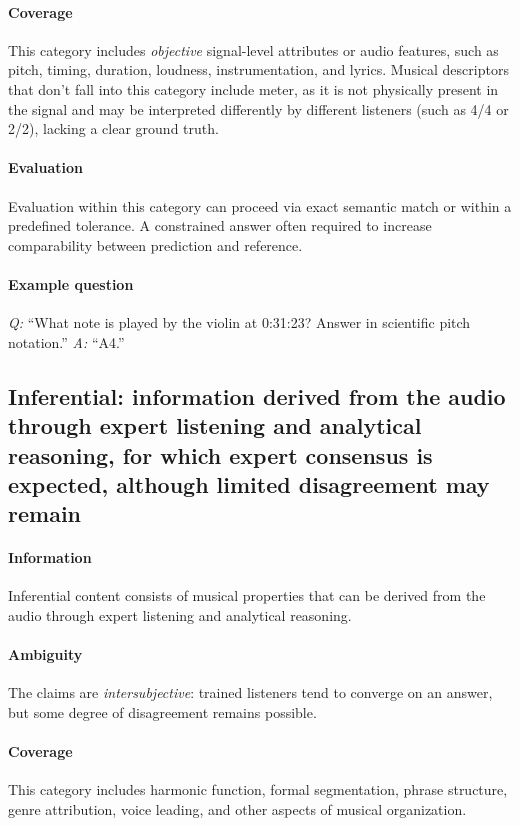\documentclass[conference,a4paper]{APSIPA2026}
\begin{document}
\paragraph{Coverage}
This category includes \emph{objective} signal-level attributes or audio features, such as pitch, timing, duration, loudness, instrumentation, and lyrics. Musical descriptors that don't fall into this category include meter, as it is not physically present in the signal and may be interpreted differently by different listeners (such as 4/4 or 2/2), lacking a clear ground truth. 

\paragraph{Evaluation}
Evaluation within this category can proceed via exact semantic match or within a predefined tolerance. A constrained answer often required to increase comparability between prediction and reference.

\paragraph{Example question}
\emph{Q:} ``What note is played by the violin at 0:31:23? Answer in scientific pitch notation.''  
\emph{A:} ``A4.''




\subsection{\textbf{Inferential}: information derived from the audio through expert listening and analytical reasoning, for which expert consensus is expected, although limited disagreement may remain}

\paragraph{Information}
Inferential content consists of musical properties that can be derived from the audio through expert listening and analytical reasoning. 

\paragraph{Ambiguity}
The claims are \emph{intersubjective}: trained listeners tend to converge on an answer, but some degree of disagreement remains possible.

\paragraph{Coverage}
This category includes harmonic function, formal segmentation, phrase structure, genre attribution, voice leading, and other aspects of musical organization.
\end{document}
